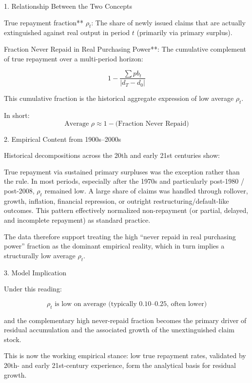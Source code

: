 1. Relationship Between the Two Concepts

True repayment fraction** \(\rho_t\):  
  The share of newly issued claims that are actually extinguished against real output in period \(t\) (primarily via primary surplus).

Fraction Never Repaid in Real Purchasing Power**:  
  The cumulative complement of true repayment over a multi-period horizon:

\[
1 - \frac{\sum pb_t}{\lvert d_T - d_0 \rvert}
\]

This cumulative fraction is the historical aggregate expression of low average \(\rho_t\).

In short:
\[
\text{Average }\rho \approx 1 - \text{(Fraction Never Repaid)}
\]

2. Empirical Content from 1900s–2000s

Historical decompositions across the 20th and early 21st centuries show:

True repayment via sustained primary surpluses was the exception rather than the rule.
In most periods, especially after the 1970s and particularly post-1980 / post-2008, \(\rho_t\) remained low.
A large share of claims was handled through rollover, growth, inflation, financial repression, or outright restructuring/default-like outcomes.
This pattern effectively normalized non-repayment (or partial, delayed, and incomplete repayment) as standard practice.

The data therefore support treating the high “never repaid in real purchasing power” fraction as the dominant empirical reality, which in turn implies a structurally low average \(\rho_t\).

3. Model Implication

Under this reading:

\[
\rho_t \text{ is low on average (typically 0.10–0.25, often lower)}
\]

and the complementary high never-repaid fraction becomes the primary driver of residual accumulation and the associated growth of the unextinguished claim stock.

This is now the working empirical stance: low true repayment rates, validated by 20th- and early 21st-century experience, form the analytical basis for residual growth.
